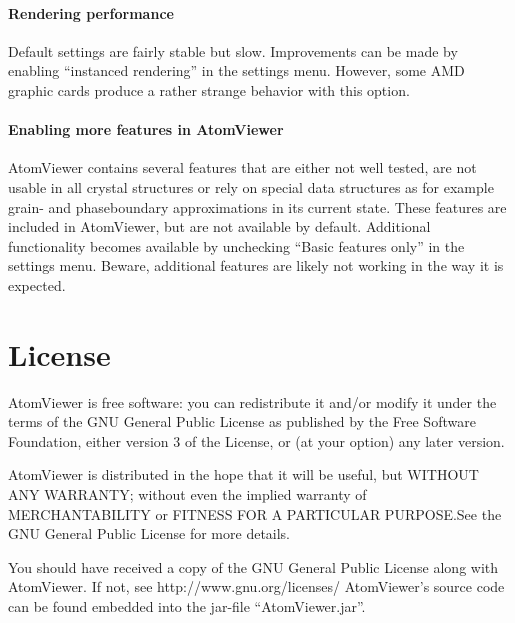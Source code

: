 \documentclass[a4paper,12pt]{scrartcl}
\begin{document}
\paragraph{Rendering performance}
Default settings are fairly stable but slow. Improvements can be made by enabling ``instanced rendering'' in the settings menu. However, some AMD graphic cards produce a rather strange behavior with this option.

\paragraph{Enabling more features in AtomViewer}
AtomViewer contains several features that are either not well tested, are not usable in all crystal structures or rely on special data structures as for example grain- and phaseboundary approximations in its current state. These features are included in AtomViewer, but are not available by default. Additional functionality becomes available by unchecking ``Basic features only'' in the settings menu. Beware, additional features are likely not working in the way it is expected.

\section{License}
AtomViewer is free software: you can redistribute it and/or modify it under the terms of the GNU General Public License as published by the Free Software Foundation, either version 3 of the License, or (at your option) any later version.

AtomViewer is distributed in the hope that it will be useful, but WITHOUT ANY WARRANTY; without even the implied warranty of MERCHANTABILITY or FITNESS FOR A PARTICULAR PURPOSE.See the GNU General Public License for more details.

You should have received a copy of the GNU General Public License along  with AtomViewer. If not, see http://www.gnu.org/licenses/
AtomViewer's source code can be found embedded into the jar-file ``AtomViewer.jar''.



\end{document}
